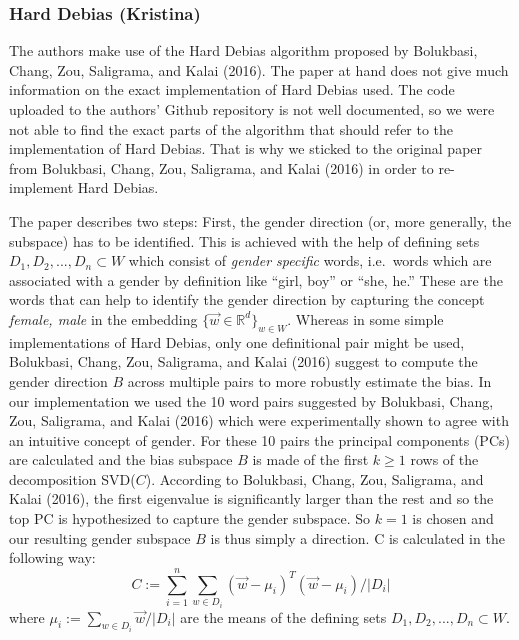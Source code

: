 \documentclass[
  english,
  man,floatsintext]{apa6}
\begin{document}
\hypertarget{hard-debias-kristina}{%
\subsubsection{Hard Debias (Kristina)}\label{hard-debias-kristina}}

The authors make use of the Hard Debias algorithm proposed by Bolukbasi, Chang, Zou, Saligrama, and Kalai (2016). The paper at hand does not give much information on the exact implementation of Hard Debias used. The code uploaded to the authors' Github repository is not well documented, so we were not able to find the exact parts of the algorithm that should refer to the implementation of Hard Debias. That is why we sticked to the original paper from Bolukbasi, Chang, Zou, Saligrama, and Kalai (2016) in order to re-implement Hard Debias.

The paper describes two steps: First, the gender direction (or, more generally, the subspace) has to be identified. This is achieved with the help of defining sets \(D_1, D_2, ..., D_n \subset W\) which consist of \emph{gender specific} words, i.e.~words which are associated with a gender by definition like ``girl, boy'' or ``she, he.'' These are the words that can help to identify the gender direction by capturing the concept \emph{female, male} in the embedding \(\{\vec{w}\in\mathbb{R}^d\}_{w\in W}\). Whereas in some simple implementations of Hard Debias, only one definitional pair might be used, Bolukbasi, Chang, Zou, Saligrama, and Kalai (2016) suggest to compute the gender direction \(B\) across multiple pairs to more robustly estimate the bias. In our implementation we used the 10 word pairs suggested by Bolukbasi, Chang, Zou, Saligrama, and Kalai (2016) which were experimentally shown to agree with an intuitive concept of gender. For these 10 pairs the principal components (PCs) are calculated and the bias subspace \(B\) is made of the first \(k \geq 1\) rows of the decomposition SVD(\(C\)). According to Bolukbasi, Chang, Zou, Saligrama, and Kalai (2016), the first eigenvalue is significantly larger than the rest and so the top PC is hypothesized to capture the gender subspace. So \(k=1\) is chosen and our resulting gender subspace \(B\) is thus simply a direction. C is calculated in the following way: \[C:=\sum_{i=1}^n \sum_{w\in D_i}(\vec{w}-\mu_i)^T(\vec{w}-\mu_i)/|D_i|\] where \(\mu_i := \sum_{w\in D_i}\vec{w}/|D_i|\) are the means of the defining sets \(D_1, D_2, ..., D_n \subset W\).
\end{document}
